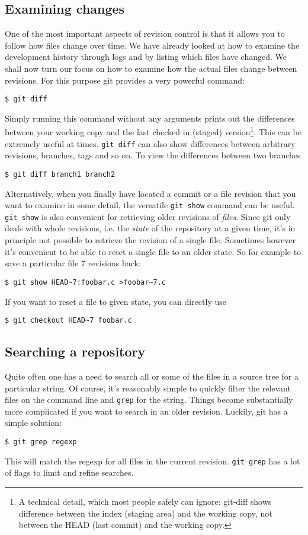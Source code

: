 \documentclass[a4paper,10pt]{article}
\begin{document}
\subsection{Examining changes}
One of the most important aspects of revision control is that it allows you to
follow how files change over time. We have already looked at how to examine
the development history through logs and by listing which files have changed.
We shall now turn our focus on how to examine how the actual files change
between revisions. For this purpose git provides a very powerful command:
\begin{verbatim}
$ git diff
\end{verbatim}
Simply running this command without any arguments prints out the differences
between your working copy and the last checked in (staged) 
version\footnote{A technical detail, which most people safely can ignore:
git-diff shows difference between the index (staging area) and the working copy,
not between the HEAD (last commit) and the working copy.}.
This can be
extremely useful at times. \texttt{git diff} can also show differences between
arbitrary revisions, branches, tags and so on. To view the differences
between two branches
\begin{verbatim}
$ git diff branch1 branch2
\end{verbatim}

Alternatively, when you finally have located a commit or a file revision that
you want to examine in some detail, the versatile \texttt{git show} command
can be useful.  \texttt{git show} is also convenient for retrieving older
revisions of \emph{files}. Since git only deals with whole revisions, i.e. the
\emph{state} of the repository at a given time, it's in principle not possible
to retrieve the revision of a single file. Sometimes however it's convenient
to be able to reset a single file to an older state.  So for example to save a
particular file 7 revisions back:
\begin{verbatim}
$ git show HEAD~7:foobar.c >foobar~7.c
\end{verbatim}
If you want to reset a file to given state, you can directly use
\begin{verbatim}
$ git checkout HEAD~7 foobar.c
\end{verbatim}

\subsection{Searching a repository}
Quite often one has a need to search all or some of the files in a source
tree for a particular string. Of course, it's reasonably simple to quickly
filter the relevant files on the command line and \texttt{grep} for the
string. Things become substantially more complicated if you want to search in 
an older revision. Luckily, git has a simple solution:
\begin{verbatim}
$ git grep regexp 
\end{verbatim}
This will match the regexp for all files in the current revision.
\texttt{git grep} has a lot of flags to limit and refine searches.
\end{document}
